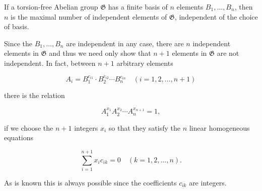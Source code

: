 If a torsion-free Abelian group $\mathfrak{G}$ has a finite basis of $n$ elements $B_1, \ldots, B_n$, then $n$ is the maximal number of independent elements of $\mathfrak{G}$, independent of the choice of basis.

Since the $B_1, \ldots, B_n$ are independent in any case, there are $n$ independent elements in $\mathfrak{G}$ and thus we need only show that $n + 1$ elements in $\mathfrak{G}$ are not independent. In fact, between $n + 1$ arbitrary elements

$$A_i = B_1^{c_{i1}} \cdot B_2^{c_{i2}} \cdots B_n^{c_{in}} \quad (i = 1, 2, \ldots, n + 1)$$

there is the relation

$$A_1^{x_1} A_2^{x_2} \cdots A_n^{x_{n+1}} = 1,$$

if we choose the $n + 1$ integers $x_i$ so that they satisfy the $n$ linear homogeneous equations

$$\sum_{i=1}^{n+1} x_i c_{ik} = 0 \quad (k = 1, 2, \ldots, n).$$

As is known this is always possible since the coefficients $c_{ik}$ are integers.
